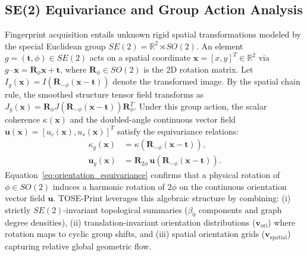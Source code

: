 \documentclass[lettersize,journal]{IEEEtran}
\begin{document}
\subsection{SE(2) Equivariance and Group Action Analysis}
\label{sec:se2_formulation}
Fingerprint acquisition entails unknown rigid spatial transformations modeled by the special Euclidean group $SE(2) = \mathbb{R}^2 \rtimes SO(2)$. An element $g = (\mathbf{t}, \phi) \in SE(2)$ acts on a spatial coordinate $\mathbf{x} = [x, y]^T \in \mathbb{R}^2$ via $g \cdot \mathbf{x} = \mathbf{R}_\phi \mathbf{x} + \mathbf{t}$, where $\mathbf{R}_\phi \in SO(2)$ is the 2D rotation matrix. Let $I_g(\mathbf{x}) = I(\mathbf{R}_{-\phi}(\mathbf{x} - \mathbf{t}))$ denote the transformed image. By the spatial chain rule, the smoothed structure tensor field transforms as $J_g(\mathbf{x}) = \mathbf{R}_\phi J(\mathbf{R}_{-\phi}(\mathbf{x} - \mathbf{t})) \mathbf{R}_\phi^T$. Under this group action, the scalar coherence $\kappa(\mathbf{x})$ and the doubled-angle continuous vector field $\mathbf{u}(\mathbf{x}) = [u_c(\mathbf{x}), u_s(\mathbf{x})]^T$ satisfy the equivariance relations:
\begin{align}
    \kappa_g(\mathbf{x}) &= \kappa(\mathbf{R}_{-\phi}(\mathbf{x} - \mathbf{t})), \label{eq:coherence_equivariance} \\
    \mathbf{u}_g(\mathbf{x}) &= \mathbf{R}_{2\phi} \, \mathbf{u}(\mathbf{R}_{-\phi}(\mathbf{x} - \mathbf{t})). \label{eq:orientation_equivariance}
\end{align}
Equation~\eqref{eq:orientation_equivariance} confirms that a physical rotation of $\phi \in SO(2)$ induces a harmonic rotation of $2\phi$ on the continuous orientation vector field $\mathbf{u}$. TOSE-Print leverages this algebraic structure by combining: (i) strictly $SE(2)$-invariant topological summaries ($\beta_0$ components and graph degree densities), (ii) translation-invariant orientation distributions ($\mathbf{v}_{\text{ori}}$) where rotation maps to cyclic group shifts, and (iii) spatial orientation grids ($\mathbf{v}_{\text{spatial}}$) capturing relative global geometric flow.
\end{document}

